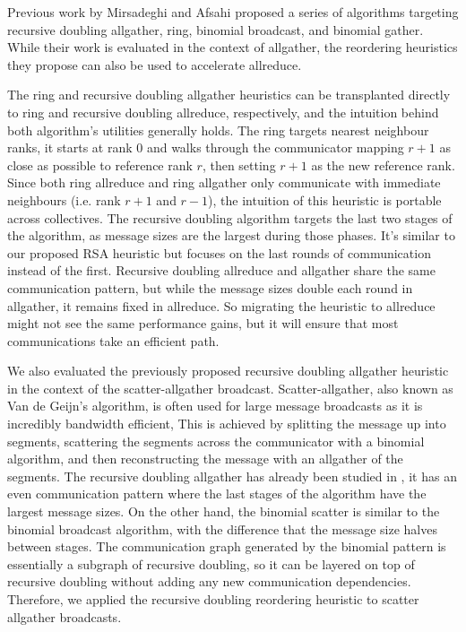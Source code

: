 Previous work by Mirsadeghi and Afsahi \cite{Mirsadeghi2016TopoAwareCollRR} proposed a series of algorithms targeting recursive doubling allgather, ring, binomial broadcast, and binomial gather. 
While their work is evaluated in the context of allgather, the reordering heuristics they propose can also be used to accelerate allreduce. 

The ring and recursive doubling allgather heuristics can be transplanted directly to ring and recursive doubling allreduce, respectively, and the intuition behind both algorithm's utilities generally holds. 
The ring targets nearest neighbour ranks, it starts at rank 0 and walks through the communicator mapping $r+1$ as close as possible to reference rank $r$, then setting $r+1$ as the new reference rank.
Since both ring allreduce and ring allgather only communicate with immediate neighbours (i.e. rank $r+1$ and $r-1$), the intuition of this heuristic is portable across collectives.
The recursive doubling algorithm targets the last two stages of the algorithm, as message sizes are the largest during those phases. 
It's similar to our proposed RSA heuristic but focuses on the last rounds of communication instead of the first. 
Recursive doubling allreduce and allgather share the same communication pattern, but while the message sizes double each round in allgather,  it remains fixed in allreduce.
So migrating the heuristic to allreduce might not see the same performance gains, but it will ensure that most communications take an efficient path.

We also evaluated the previously proposed recursive doubling allgather heuristic in the context of the scatter-allgather broadcast.
Scatter-allgather, also known as Van de Geijn's algorithm, is often used for large message broadcasts as it is incredibly bandwidth efficient, 
This is achieved by splitting the message up into segments, scattering the segments across the communicator with a binomial algorithm, and then reconstructing the message with an allgather of the segments.
The recursive doubling allgather has already been studied in \cite{Mirsadeghi2016TopoAwareCollRR}, it has an even communication pattern where the last stages of the algorithm have the largest message sizes.
On the other hand, the binomial scatter is similar to the binomial broadcast algorithm, with the difference that the message size halves between stages. 
The communication graph generated by the binomial pattern is essentially a subgraph of recursive doubling, so it can be layered on top of recursive doubling without adding any new communication dependencies. 
Therefore, we applied the recursive doubling reordering heuristic to scatter allgather broadcasts.

